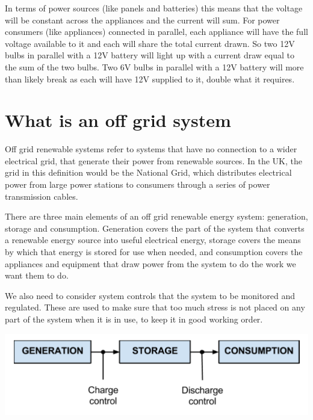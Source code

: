 \documentclass{article}
\theoremstyle{definition}
\theoremstyle{definition}
\theoremstyle{remark}
\begin{document}
    In terms of power sources (like panels and batteries) this means that the voltage will be constant across the appliances and the current will sum. For power consumers (like appliances) connected in parallel, each appliance will have the full voltage available to it and each will share the total current drawn. So two 12V bulbs in parallel with a 12V battery will light up with a current draw equal to the sum of the two bulbs. Two 6V bulbs in parallel with a 12V battery will more than likely break as each will have 12V supplied to it, double what it requires. 
  


\section{What is an off grid system} %
\label{sec:what_is_an_off_grid_system}

  Off grid renewable systems refer to systems that have no connection to a wider electrical grid, that generate their power from renewable sources. In the UK, the grid in this definition would be the National Grid, which distributes electrical power from large power stations to consumers through a series of power transmission cables.

  There are three main elements of an off grid renewable energy system: generation, storage and consumption. Generation covers the part of the system that converts a renewable energy source into useful electrical energy, storage covers the means by which that energy is stored for use when needed, and consumption covers the appliances and equipment that draw power from the system to do the work we want them to do.

  We also need to consider system controls that the system to be monitored and regulated. These are used to make sure that too much stress is not placed on any part of the system when it is in use, to keep it in good working order.

  \begin{center}
    \includegraphics[width=0.60\paperwidth]{Images/image_3_1_(off_grid_diagram).png}
  \end{center}
\end{document}
